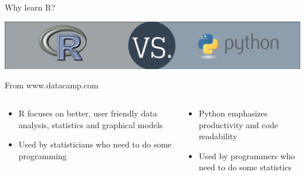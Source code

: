 \documentclass[aspectratio=169]{beamer}\usepackage[]{graphicx}\usepackage[]{color}
\begin{document}
\begin{frame}{Why learn R?}
		\begin{center}
			\includegraphics[width=1.0\textwidth]{./images/RvsPython}
		\end{center}

From www.datacamp.com
\begin{columns}
  \begin{column}{0.5\textwidth}
    \begin{itemize}
      \item R focuses on better, user friendly data analysis, statistics and graphical models
      \item Used by statisticians who need to do some programming
    \end{itemize}
	\end{column}
	\begin{column}{0.5\textwidth}
    \begin{itemize}
      \item Python emphasizes productivity and code readability
      \item Used by programmers who need to do some statistics
    \end{itemize}
	\end{column}
\end{columns}
\end{frame}
\end{document}
